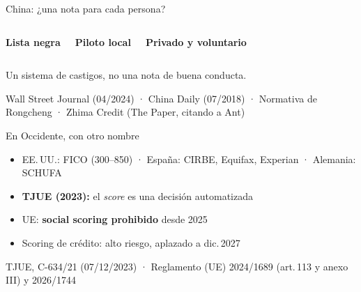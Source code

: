 \documentclass[aspectratio=169,12pt]{beamer}
\newcommand{\fuente}[1]{\vfill{\small\color{gris}#1\par}}
\begin{document}
\begin{frame}{China: ¿una nota para cada persona?}
  \begin{columns}[T]
      \begin{center}{\large\bfseries\color{azul}Lista negra}\end{center}
      \begin{center}{\large\bfseries\color{azul}Piloto local}\end{center}
      \begin{center}{\large\bfseries\color{azul}Privado y voluntario}\end{center}
  \end{columns}
  \vspace{0.3cm}
  \begin{center}
    {\large\alert{Un sistema de castigos, no una nota de buena conducta.}}
  \end{center}
  \fuente{Wall Street Journal (04/2024) · China Daily (07/2018) · Normativa de Rongcheng · Zhima Credit (The Paper, citando a Ant)}
\end{frame}

\begin{frame}{En Occidente, con otro nombre}
  \begin{itemize}
    \item EE.\,UU.: FICO (300--850) · España: CIRBE, Equifax, Experian · Alemania: SCHUFA
    \item \alert{\textbf{TJUE (2023):}} el \textit{score} es una decisión automatizada
    \item UE: \alert{\textbf{social scoring prohibido}} desde 2025
    \item Scoring de crédito: alto riesgo, aplazado a dic.\,2027
  \end{itemize}
  \fuente{TJUE, C-634/21 (07/12/2023) · Reglamento (UE) 2024/1689 (art.\,113 y anexo III) y 2026/1744}
\end{frame}
\end{document}
